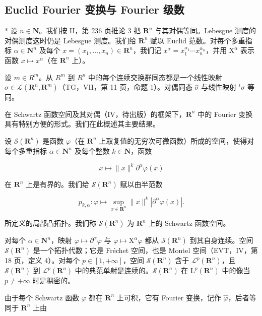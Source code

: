 \subsection{Euclid Fourier 变换与 Fourier 级数}

* 设 \(n \in \mathbf{N}\)。我们按 II，第 236 页推论 3 把 \(\mathbf{R}^n\) 与其对偶等同。Lebesgue 测度的对偶测度这时仍是 Lebesgue 测度。我们给 \(\mathbf{R}^n\) 赋以 Euclid 范数。对每个多重指标 \(\alpha \in \mathbf{N}^n\) 及每个 \(x = (x_1, \ldots, x_n) \in \mathbf{R}^n\)，我们记 \(x^\alpha = x_1^{\alpha_1} \cdots x_n^{\alpha_n}\)，并用 \(\mathrm{X}^\alpha\) 表示函数 \(x \mapsto x^\alpha\)（在 \(\mathbf{R}^n\) 上）。

设 \(m \in R^{m}\)。从 \(R^{m}\) 到 \(R^{n}\) 中的每个连续交换群同态都是一个线性映射 \(\sigma \in \mathcal{L}(\mathbf{R}^{n}, \mathbf{R}^{m})\)（TG，VII，第 11 页，命题 1）。对偶同态 \(\widehat{\sigma}\) 与线性映射 \(^{t}\sigma\) 等同。

在 Schwartz 函数空间及其对偶（IV，待出版）的框架下，\(\mathbf{R}^n\) 中的 Fourier 变换具有特别方便的形式。我们在此概述其主要结果。

设 \(\mathcal{S}(\mathbf{R}^{n})\) 是函数 \(\varphi\)（在 \(\mathbf{R}^{n}\) 上取复值的无穷次可微函数）所成的空间，使得对每个多重指标 \(\alpha\in\mathbf{N}^{n}\) 及每个整数 \(k\in\mathbf{N}\)，函数

\[
x \mapsto \| x \| ^ {k} \partial^ {\alpha} \varphi (x)
\]

在 \(\mathbf{R}^{n}\) 上是有界的。我们给 \(\mathcal{S}(\mathbf{R}^{n})\) 赋以由半范数

\[
p _ {k, \alpha} \colon \varphi \mapsto \sup _ {x \in \mathbf {R} ^ {n}} \| x \| ^ {k} | \partial^ {\alpha} \varphi (x) |.
\]

所定义的局部凸拓扑。我们称 \(\mathcal{S}(\mathbf{R}^{n})\) 为 \(\mathbf{R}^{n}\) 上的 Schwartz 函数空间。

对每个 \(\alpha \in \mathbf{N}^n\)，映射 \(\varphi \mapsto \partial^\alpha \varphi\) 与 \(\varphi \mapsto \mathrm{X}^\alpha \varphi\) 都从 \(\mathcal{S}(\mathbf{R}^n)\) 到其自身连续。空间 \(\mathcal{S}(\mathbf{R}^n)\) 是一个拓扑代数；它是 Fréchet 空间，也是 Montel 空间（EVT，IV，第 18 页，定义 4）。对每个 \(p \in [1, +\infty]\)，空间 \(\mathcal{S}(\mathbf{R}^n)\) 含于 \(\mathcal{L}^p (\mathbf{R}^n)\)，且 \(\mathcal{S}(\mathbf{R}^n)\) 到 \(\mathcal{L}^p (\mathbf{R}^n)\) 中的典范单射是连续的。\(\mathcal{S}(\mathbf{R}^n)\) 在 \(\mathrm{L}^p (\mathbf{R}^n)\) 中的像当 \(p \neq +\infty\) 时是稠密的。

由于每个 Schwartz 函数 \(\varphi\) 都在 \(\mathbf{R}^n\) 上可积，它有 Fourier 变换，记作 \(\widehat{\varphi}\)，后者等同于 \(\mathbf{R}^n\) 上由


